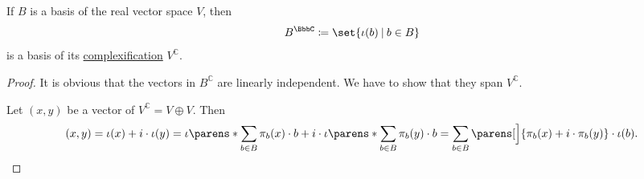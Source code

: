 \begin{proposition}\label{thm:basis_of_complexification}
  If \( B \) is a basis of the real vector space \( V \), then
  \begin{equation*}
    B^\BbbC \coloneqq \set{ \iota(b) \given b \in B }
  \end{equation*}
  is a basis of its \hyperref[def:complexification]{complexification} \( V^\BbbC \).
\end{proposition}
\begin{proof}
  It is obvious that the vectors in \( B^\BbbC \) are linearly independent. We have to show that they span \( V^\BbbC \).

  Let \( (x, y) \) be a vector of \( V^\BbbC = V \oplus V \). Then
  \begin{equation*}
    (x, y)
    =
    \iota(x) + i \cdot \iota(y)
    =
    \iota\parens*{ \sum_{b \in B} \pi_b(x) \cdot b } + i \cdot \iota\parens*{ \sum_{b \in B} \pi_b(y) \cdot b }
    =
    \sum_{b \in B} \parens[\Big]{ \pi_b(x) + i \cdot \pi_b(y) } \cdot \iota(b).
  \end{equation*}
\end{proof}

